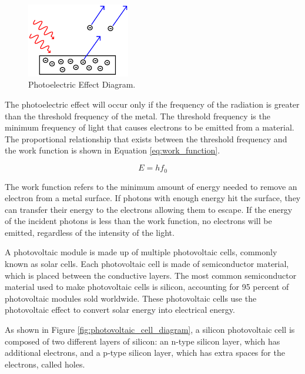 \begin{figure}[ht]
    \centering
    \includegraphics[width=0.4\textwidth]{Figures/photoelectric_effect_diagram.png}
    \caption{Photoelectric Effect Diagram. \cite{KhanAcademyPhotoelectricEffect}}
    \label{fig:photoelectric_effect_diagram}
\end{figure}
\FloatBarrier

The photoelectric effect will occur only if the frequency of the radiation is greater than the threshold frequency of the metal. The threshold frequency is the minimum frequency of light that causes electrons to be emitted from a material. The proportional relationship that exists between the threshold frequency and the work function is shown in Equation \ref{eq:work_function}.

\begin{equation}
    E = hf_0
    \label{eq:work_function}
\end{equation}

The work function refers to the minimum amount of energy needed to remove an electron from a metal surface. If photons with enough energy hit the surface, they can transfer their energy to the electrons allowing them to escape. If the energy of the incident photons is less than the work function, no electrons will be emitted, regardless of the intensity of the light. \cite{ScienceABC2023PhotoelectricBeginners}\vspace{0.5em}

A photovoltaic module is made up of multiple photovoltaic cells, commonly known as solar cells. Each photovoltaic cell is made of semiconductor material, which is placed between the conductive layers. The most common semiconductor material used to make photovoltaic cells is silicon, accounting for 95 percent of photovoltaic modules sold worldwide. \cite{U.S.DEPARTMENTofENERGYSolarBasics} These photovoltaic cells use the photovoltaic effect to convert solar energy into electrical energy.\vspace{0.5em}

As shown in Figure \ref{fig:photovoltaic_cell_diagram}, a silicon photovoltaic cell is composed of two different layers of silicon: an n-type silicon layer, which has additional electrons, and a p-type silicon layer, which has extra spaces for the electrons, called holes.\vspace{0.5em}


